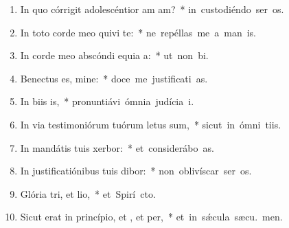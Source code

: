 \begin{flushleft}
\begin{enumerate}[leftmargin=*]

\item In quo córrigit adolescéntior am am?~* \mbox{in custodiéndo ser os.}
\item In toto corde meo quivi te:~* \mbox{ne repéllas me a man is.}
\item In corde meo abscóndi equia a:~* \mbox{ut non  bi.}
\item Benectus es, mine:~* \mbox{doce me justificati as.}
\item In biis is,~* \mbox{pronuntiávi ómnia judícia  i.}
\item In via testimoniórum tuórum letus sum,~* \mbox{sicut in ómni tiis.}
\item In mandátis tuis xerbor:~* \mbox{et considerábo  as.}
\item In justificatiónibus tuis dibor:~* \mbox{non oblivíscar ser os.}
\item Glória tri, et lio,~* \mbox{et Spirí cto.}
\item Sicut erat in princípio, et , et per,~* \mbox{et in s\'{\ae}cula sæcu. men.}


\end{enumerate}
\end{flushleft}


